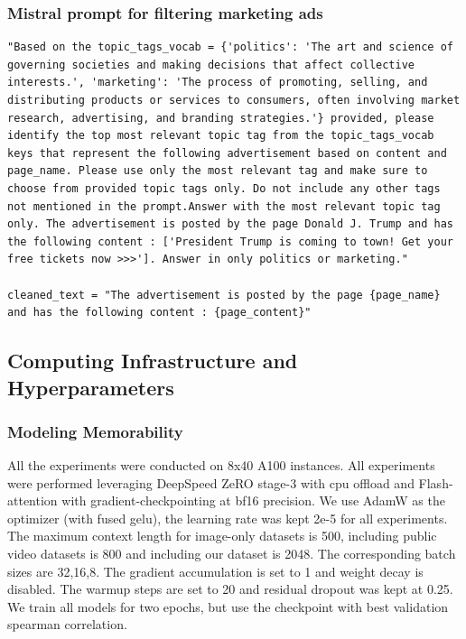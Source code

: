 \subsubsection{Mistral prompt for filtering marketing ads}
\label{lst:msitral-filter-prompt}
\begin{lstlisting}[caption={Mistral Prompt for Ad Filtering},label={listing:Mistral Prompt for Ad Filtering},frame=single,breaklines=true,basicstyle=\tiny,]
"Based on the topic_tags_vocab = {'politics': 'The art and science of governing societies and making decisions that affect collective interests.', 'marketing': 'The process of promoting, selling, and distributing products or services to consumers, often involving market research, advertising, and branding strategies.'} provided, please identify the top most relevant topic tag from the topic_tags_vocab keys that represent the following advertisement based on content and page_name. Please use only the most relevant tag and make sure to choose from provided topic tags only. Do not include any other tags not mentioned in the prompt.Answer with the most relevant topic tag only. The advertisement is posted by the page Donald J. Trump and has the following content : ['President Trump is coming to town! Get your free tickets now >>>']. Answer in only politics or marketing."

cleaned_text = "The advertisement is posted by the page {page_name} and has the following content : {page_content}"
\end{lstlisting}

\subsection{Computing Infrastructure and Hyperparameters}
\subsubsection{Modeling Memorability}
\label{sec:experimental-details}
All the experiments were conducted on 8x40 A100 instances. All experiments were performed leveraging DeepSpeed ZeRO stage-3 with cpu offload \cite{ren2021zero,rasley2020deepspeed,rajbhandari2020zero} and Flash-attention \cite{dao2022flashattention} with gradient-checkpointing \cite{chen2016training} at bf16 precision. We use AdamW as the optimizer (with fused gelu), the learning rate was kept 2e-5 for all experiments. The maximum context length for image-only datasets is 500, including public video datasets is 800 and including our dataset is 2048. The corresponding batch sizes are 32,16,8. The gradient accumulation is set to 1 and weight decay is disabled. The warmup steps are set to 20 and residual dropout was kept at 0.25. We train all models for two epochs, but use the checkpoint with best validation spearman correlation.

